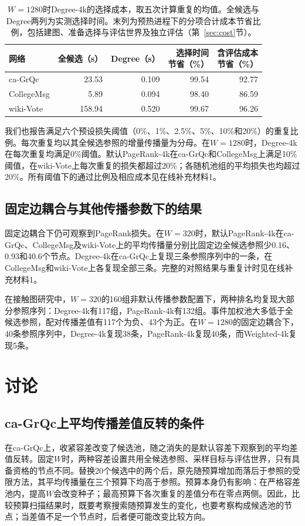 \documentclass[smallextended]{svjour3}
\begin{document}
\begin{table}[htbp]
\caption{$W=1280$时Degree-4k的选择成本，取五次计算重复的均值。全候选与Degree两列为实测选择时间。末列为预热进程下的分项合计成本节省比例，包括建图、准备选择与评估世界及独立评估（第~\ref{sec:cost}节）。}\label{tab:cost}
\begin{tabular}{lrrrr}
\toprule
网络 & 全候选（s） & Degree（s） & \shortstack{选择时间\\节省（\%）} & \shortstack{含评估成本\\节省（\%）} \\
\midrule
ca-GrQc & 23.53 & 0.109 & 99.54 & 92.77 \\
CollegeMsg & 5.89 & 0.094 & 98.40 & 86.59 \\
wiki-Vote & 158.94 & 0.520 & 99.67 & 96.26 \\
\bottomrule
\end{tabular}
\end{table}

我们也报告满足六个预设损失阈值（0\%、1\%、2.5\%、5\%、10\%和20\%）的重复比例。每次重复均以其全候选参照的增量传播量为分母。在$W=1280$时，Degree-4k在每次重复均满足0\%阈值。默认PageRank-4k在ca-GrQc和CollegeMsg上满足10\%阈值，在wiki-Vote上每次重复的损失都超过20\%；各随机池组的平均损失也均超过20\%。所有阈值下的通过比例及相应成本见在线补充材料1。

\subsection{固定边耦合与其他传播参数下的结果}
固定边耦合下仍可观察到PageRank损失。在$W=320$时，默认PageRank-4k在ca-GrQc、CollegeMsg及wiki-Vote上的平均传播量分别比固定边全候选参照少0.16、0.93和40.6个节点。Degree-4k在ca-GrQc上复现三条参照序列中的一条，在CollegeMsg和wiki-Vote上各复现全部三条。完整的对照结果与重复计时见在线补充材料1。

在接触图研究中，$W=320$的160组非默认传播参数配置下，两种排名均复现大部分参照序列：Degree-4k有117组，PageRank-4k有132组。事件加权池大多低于全候选参照，配对传播差值有117个为负、43个为正。在$W=1280$的固定边耦合下，40条参照序列中，Degree-4k复现38条，PageRank-4k复现40条，而Weighted-4k复现5条。
\FloatBarrier

\section{讨论}
\subsection{ca-GrQc上平均传播差值反转的条件}
在ca-GrQc上，收紧容差改变了候选池，随之消失的是默认容差下观察到的平均差值反转。固定$W$时，两种容差设置共用全候选参照、采样目标与评估世界，只有具备资格的节点不同。替换20个候选中的两个后，原先随预算增加而落后于参照的受限方法，其平均传播量在三个预算下均高于参照。预算本身仍有影响：在严格容差池内，提高$W$会改变种子；最高预算下各次重复的差值分布在零点两侧。因此，比较预算扫描结果时，既要考察搜索随预算发生的变化，也要考察构成候选池的节点；当差值不足一个节点时，后者便可能改变比较方向。
\end{document}
